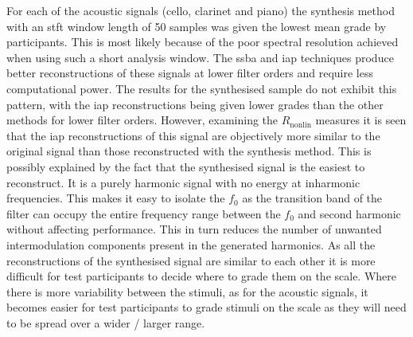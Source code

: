 		For each of the acoustic signals (cello, clarinet and piano) the synthesis method with an \acrshort{stft}
		window length of 50 samples was given the lowest mean grade by participants. This is most likely because of
		the poor spectral resolution achieved when using such a short analysis window. The \acrshort{ssba} and
		\acrshort{iap} techniques produce better reconstructions of these signals at lower filter orders and
		require less computational power. The results for the synthesised sample do not exhibit this pattern, with
		the \acrshort{iap} reconstructions being given lower grades than the other methods for lower filter orders.
		However, examining the $R_{\mathrm{nonlin}}$ measures it is seen that the \acrshort{iap} reconstructions of
		this signal are objectively more similar to the original signal than those reconstructed with the synthesis
		method. This is possibly explained by the fact that the synthesised signal is the easiest to reconstruct.
		It is a purely harmonic signal with no energy at inharmonic frequencies. This makes it easy to isolate the
		$f_{0}$ as the transition band of the filter can occupy the entire frequency range between the $f_{0}$ and
		second harmonic without affecting performance. This in turn reduces the number of unwanted intermodulation
		components present in the generated harmonics. As all the reconstructions of the synthesised signal are
		similar to each other it is more difficult for test participants to decide where to grade them on the
		scale. Where there is more variability between the stimuli, as for the acoustic signals, it becomes easier
		for test participants to grade stimuli on the scale as they will need to be spread over a wider / larger
		range.

